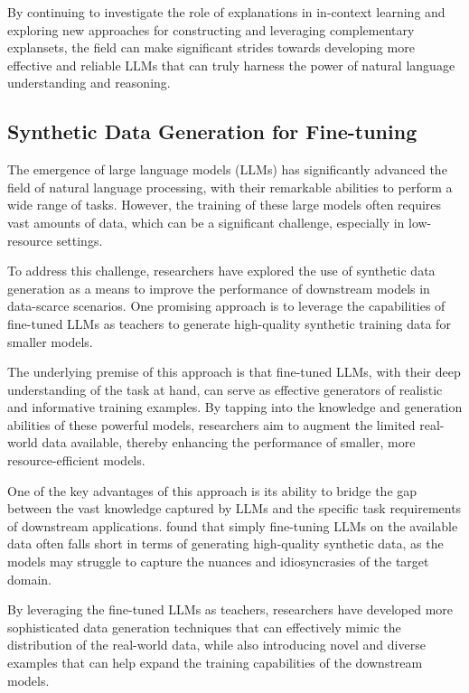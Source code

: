 \documentclass[11pt]{article}
\begin{document}
By continuing to investigate the role of explanations in in-context learning and exploring new approaches for constructing and leveraging complementary explansets, the field can make significant strides towards developing more effective and reliable LLMs that can truly harness the power of natural language understanding and reasoning.

\subsection{Synthetic Data Generation for Fine-tuning}

The emergence of large language models (LLMs) has significantly advanced the field of natural language processing, with their remarkable abilities to perform a wide range of tasks. However, the training of these large models often requires vast amounts of data, which can be a significant challenge, especially in low-resource settings.

To address this challenge, researchers have explored the use of synthetic data generation as a means to improve the performance of downstream models in data-scarce scenarios. One promising approach is to leverage the capabilities of fine-tuned LLMs as teachers to generate high-quality synthetic training data for smaller models.

The underlying premise of this approach is that fine-tuned LLMs, with their deep understanding of the task at hand, can serve as effective generators of realistic and informative training examples. By tapping into the knowledge and generation abilities of these powerful models, researchers aim to augment the limited real-world data available, thereby enhancing the performance of smaller, more resource-efficient models.

One of the key advantages of this approach is its ability to bridge the gap between the vast knowledge captured by LLMs and the specific task requirements of downstream applications. \cite{ref224} found that simply fine-tuning LLMs on the available data often falls short in terms of generating high-quality synthetic data, as the models may struggle to capture the nuances and idiosyncrasies of the target domain.

By leveraging the fine-tuned LLMs as teachers, researchers have developed more sophisticated data generation techniques that can effectively mimic the distribution of the real-world data, while also introducing novel and diverse examples that can help expand the training capabilities of the downstream models.
\end{document}
